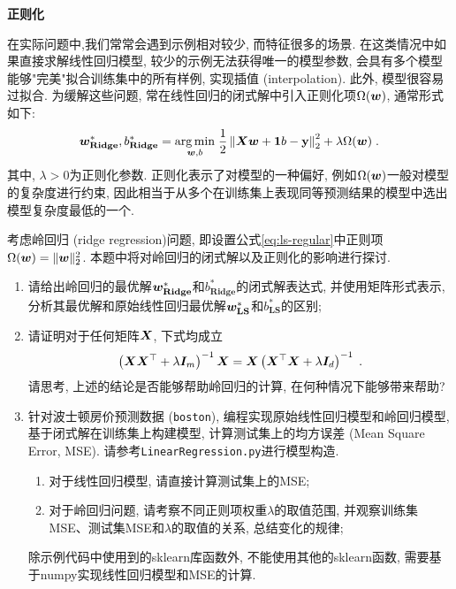 \documentclass[answers]{exam}  %
\begin{document}
\begin{questions}
	\begin{solution}
	\end{solution}


\question [25] \textbf{正则化}

在实际问题中,我们常常会遇到示例相对较少, 而特征很多的场景. 在这类情况中如果直接求解线性回归模型, 较少的示例无法获得唯一的模型参数, 会具有多个模型能够"完美"拟合训练集中的所有样例, 实现插值 (interpolation). 此外, 模型很容易过拟合. 为缓解这些问题, 常在线性回归的闭式解中引入正则化项$\Omega(\boldsymbol{w})$, 通常形式如下: 
\begin{equation}
  \boldsymbol{w}_{\mathbf{Ridge}}^{*}, b_{\mathbf{Ridge}}^{*}=\underset{\boldsymbol{w}, b}{\arg \min }\; \frac{1}{2}\left\|\boldsymbol{X} \boldsymbol{w}+\boldsymbol{1} b-\mathbf{y}\right\|_{2}^{2}+\lambda \Omega(\boldsymbol{w})  \label{eq:ls-regular}\;.
\end{equation}
其中, $\lambda > 0$为正则化参数. 正则化表示了对模型的一种偏好, 例如$\Omega(\boldsymbol{w})$一般对模型的复杂度进行约束, 因此相当于从多个在训练集上表现同等预测结果的模型中选出模型复杂度最低的一个. 

考虑岭回归 (ridge regression)问题, 即设置公式\eqref{eq:ls-regular}中正则项$\Omega(\boldsymbol{w}) = \lVert \boldsymbol{w}\rVert_2^2$. 本题中将对岭回归的闭式解以及正则化的影响进行探讨.
\begin{enumerate}
    \item 请给出岭回归的最优解$\boldsymbol{w}_{\mathbf{Ridge}}^*$和$b_{\mathbf{Ridge}}^*$的闭式解表达式, 并使用矩阵形式表示, 分析其最优解和原始线性回归最优解$\boldsymbol{w}_{\mathbf{LS}}^*$和$b_{\mathbf{LS}}^*$的区别;
    \item 请证明对于任何矩阵$\boldsymbol{X}$, 下式均成立
    \begin{align}
    	\left(\boldsymbol{X} \boldsymbol{X}^{\top}+\lambda \boldsymbol{I}_m\right)^{-1} \boldsymbol{X}=\boldsymbol{X}\left(\boldsymbol{X}^{\top} \boldsymbol{X}+\lambda \boldsymbol{I}_d\right)^{-1}\;.
    \end{align}
    请思考, 上述的结论是否能够帮助岭回归的计算, 在何种情况下能够带来帮助?
    \item 针对波士顿房价预测数据 (\lstinline{boston}), 编程实现原始线性回归模型和岭回归模型, 基于闭式解在训练集上构建模型, 计算测试集上的均方误差 (Mean Square Error, MSE). 请参考\lstinline{LinearRegression.py}进行模型构造. 
    
    \begin{enumerate}
        \item 对于线性回归模型, 请直接计算测试集上的MSE;
        \item 对于岭回归问题, 请考察不同正则项权重$\lambda$的取值范围, 并观察训练集MSE、测试集MSE和$\lambda$的取值的关系, 总结变化的规律;
    \end{enumerate} 除示例代码中使用到的sklearn库函数外, 不能使用其他的sklearn函数, 需要基于numpy实现线性回归模型和MSE的计算.
\end{enumerate}
	\begin{solution}
	\end{solution}


\end{questions}
\end{document}
